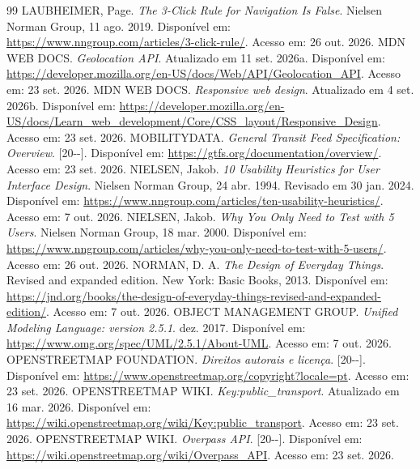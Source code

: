 \documentclass[12pt,oneside,a4paper,brazil,chapter=TITLE]{abntex2}
\begin{document}
\begin{thebibliography}{99}
 LAUBHEIMER, Page. \textit{The 3-Click Rule for Navigation Is False}. Nielsen Norman Group, 11 ago. 2019. Disponível em: \url{https://www.nngroup.com/articles/3-click-rule/}. Acesso em: 26 out. 2026.
 MDN WEB DOCS. \textit{Geolocation API}. Atualizado em 11 set. 2026a. Disponível em: \url{https://developer.mozilla.org/en-US/docs/Web/API/Geolocation_API}. Acesso em: 23 set. 2026.
 MDN WEB DOCS. \textit{Responsive web design}. Atualizado em 4 set. 2026b. Disponível em: \url{https://developer.mozilla.org/en-US/docs/Learn_web_development/Core/CSS_layout/Responsive_Design}. Acesso em: 23 set. 2026.
 MOBILITYDATA. \textit{General Transit Feed Specification: Overview}. [20\mbox{-}\mbox{-}]. Disponível em: \url{https://gtfs.org/documentation/overview/}. Acesso em: 23 set. 2026.
 NIELSEN, Jakob. \textit{10 Usability Heuristics for User Interface Design}. Nielsen Norman Group, 24 abr. 1994. Revisado em 30 jan. 2024. Disponível em: \url{https://www.nngroup.com/articles/ten-usability-heuristics/}. Acesso em: 7 out. 2026.
 NIELSEN, Jakob. \textit{Why You Only Need to Test with 5 Users}. Nielsen Norman Group, 18 mar. 2000. Disponível em: \url{https://www.nngroup.com/articles/why-you-only-need-to-test-with-5-users/}. Acesso em: 26 out. 2026.
 NORMAN, D. A. \textit{The Design of Everyday Things}. Revised and expanded edition. New York: Basic Books, 2013. Disponível em: \url{https://jnd.org/books/the-design-of-everyday-things-revised-and-expanded-edition/}. Acesso em: 7 out. 2026.
 OBJECT MANAGEMENT GROUP. \textit{Unified Modeling Language: version 2.5.1}. dez. 2017. Disponível em: \url{https://www.omg.org/spec/UML/2.5.1/About-UML}. Acesso em: 7 out. 2026.
 OPENSTREETMAP FOUNDATION. \textit{Direitos autorais e licença}. [20\mbox{-}\mbox{-}]. Disponível em: \url{https://www.openstreetmap.org/copyright?locale=pt}. Acesso em: 23 set. 2026.
 OPENSTREETMAP WIKI. \textit{Key:public\_transport}. Atualizado em 16 mar. 2026. Disponível em: \url{https://wiki.openstreetmap.org/wiki/Key:public_transport}. Acesso em: 23 set. 2026.
 OPENSTREETMAP WIKI. \textit{Overpass API}. [20\mbox{-}\mbox{-}]. Disponível em: \url{https://wiki.openstreetmap.org/wiki/Overpass_API}. Acesso em: 23 set. 2026.

\end{thebibliography}
\end{document}
